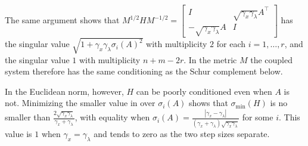 \documentclass[11pt]{article}
\begin{document}
\begin{remark}\label{rem:M-scaled-singular-values}
    The same argument shows that $M^{1/2} H M^{-1/2} = \begin{bmatrix} I & \sqrt{\gamma_x\gamma_\lambda}A^\top \\ -\sqrt{\gamma_x\gamma_\lambda}A & I\end{bmatrix}$ has the singular value $\sqrt{1 + \gamma_x\gamma_\lambda\sigma_i(A)^2}$ with multiplicity $2$ for each $i = 1, \ldots, r$, and the singular value $1$ with multiplicity $n+m-2r$.
    In the metric $M$ the coupled system therefore has the same conditioning as the Schur complement below.
\end{remark}
\begin{remark}
    In the Euclidean norm, however, $H$ can be poorly conditioned even when $A$ is not.
    Minimizing the smaller value in  over $\sigma_i(A)$ shows that $\sigma_{\min}(H)$ is no smaller than $\frac{2\sqrt{\gamma_x\gamma_\lambda}}{\gamma_x+\gamma_\lambda}$, with equality when $\sigma_i(A) = \frac{|\gamma_x - \gamma_\lambda|}{(\gamma_x + \gamma_\lambda)\sqrt{\gamma_x\gamma_\lambda}}$ for some $i$.
    This value is $1$ when $\gamma_x = \gamma_\lambda$ and tends to zero as the two step sizes separate.
\end{remark}
\end{document}
